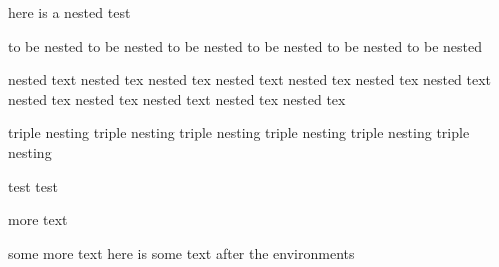 here is a nested test
\begin{one} 
	to be nested to be nested 
	to be nested to be nested 
	to be nested to be nested 	 
	\begin{two} 
		nested text nested tex nested tex 
		nested text nested tex nested tex 
		nested text nested tex nested tex 
		nested text nested tex nested tex 		 
		\begin{three} 
			triple nesting 
			triple nesting 
			triple nesting 
			triple nesting 
			triple nesting 
			triple nesting  \end{three}
		test test\end{two}
	more text\end{one}
some more text 
here is some text after the environments 

